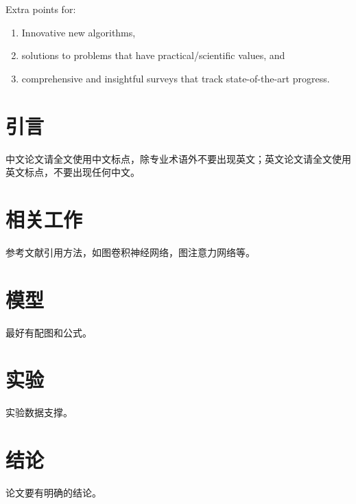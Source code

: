 \documentclass[conference]{IEEEtran}
\begin{document}
Extra points for:
\begin{enumerate}
	\item Innovative new algorithms,
	\item solutions to problems that have practical/scientific values, and
	\item comprehensive and insightful surveys that track state-of-the-art progress.
\end{enumerate}







\section{引言}

中文论文请全文使用中文标点，除专业术语外不要出现英文；英文论文请全文使用英文标点，不要出现任何中文。

\section{相关工作}

参考文献引用方法，如图卷积神经网络\cite{kipf2017semi}，图注意力网络\cite{velivckovic2018graph}等。

\section{模型}

最好有配图和公式。

\section{实验}

实验数据支撑。

\section{结论}

论文要有明确的结论。



\end{document}
